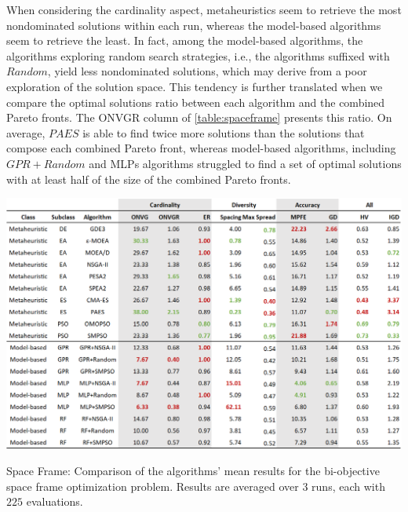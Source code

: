 When considering the cardinality aspect, metaheuristics seem to retrieve the most nondominated solutions within each run, whereas the model-based algorithms seem to retrieve the least. In fact, among the model-based algorithms, the algorithms exploring random search strategies, i.e., the algorithms suffixed with $Random$, yield less nondominated solutions, which may derive from a poor exploration of the solution space. This tendency is further translated when we compare the optimal solutions ratio between each algorithm and the combined Pareto fronts. The \ac{ONVGR} column of \cref{table:spaceframe} presents this ratio. On average, $PAES$ is able to find twice more solutions than the solutions that compose each combined Pareto front, whereas model-based algorithms, including $GPR+Random$ and \acp{MLP} algorithms struggled to find a set of optimal solutions with at least half of the size of the combined Pareto fronts. 

\begin{table}[h!]
	\centering
	\includegraphics[width=\textwidth]{Images/Evaluation/caadria/Results_Mean_20190416.PNG}
	\caption[Space Frame: Mean results of each algorithm, measured in terms of unary MOO performance indicators, discriminated per algorithms]{Space Frame: Comparison of the algorithms' mean results for the bi-objective space frame optimization problem. Results are averaged over $3$ runs, each with $225$ evaluations.}
	\label{table:spaceframe}
\end{table}


